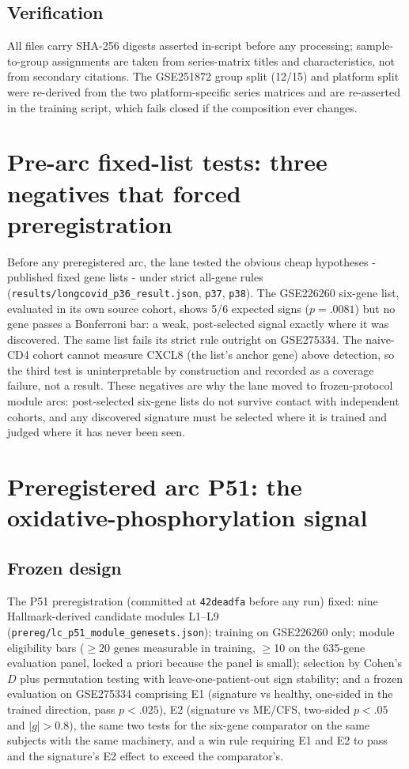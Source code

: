 \documentclass[11pt,a4paper]{article}
\begin{document}
\subsection{Verification}
All files carry SHA-256 digests asserted in-script before any processing;
sample-to-group assignments are taken from series-matrix titles and
characteristics, not from secondary citations. The GSE251872 group split
(12/15) and platform split were re-derived from the two platform-specific
series matrices and are re-asserted in the training script, which fails closed
if the composition ever changes.

\section{Pre-arc fixed-list tests: three negatives that forced preregistration}
Before any preregistered arc, the lane tested the obvious cheap hypotheses -
published fixed gene lists - under strict all-gene rules
(\texttt{results/longcovid\_p36\_result.json}, \texttt{p37}, \texttt{p38}).
The GSE226260 six-gene list, evaluated in its own source cohort, shows 5/6
expected signs ($p=.0081$) but no gene passes a Bonferroni bar: a weak,
post-selected signal exactly where it was discovered. The same list fails its
strict rule outright on GSE275334. The naive-CD4 cohort cannot measure CXCL8
(the list's anchor gene) above detection, so the third test is uninterpretable
by construction and recorded as a coverage failure, not a result. These
negatives are why the lane moved to frozen-protocol module arcs: post-selected
six-gene lists do not survive contact with independent cohorts, and any
discovered signature must be selected where it is trained and judged where it
has never been seen.

\section{Preregistered arc P51: the oxidative-phosphorylation signal}
\subsection{Frozen design}
The P51 preregistration (committed at \texttt{42deadfa} before any run) fixed:
nine Hallmark-derived candidate modules L1--L9
(\texttt{prereg/lc\_p51\_module\_genesets.json}); training on GSE226260 only;
module eligibility bars ($\geq$20 genes measurable in training, $\geq$10 on the
635-gene evaluation panel, locked a priori because the panel is small);
selection by Cohen's $D$ plus permutation testing with leave-one-patient-out
sign stability; and a frozen evaluation on GSE275334 comprising E1 (signature
vs healthy, one-sided in the trained direction, pass $p<.025$), E2 (signature
vs ME/CFS, two-sided $p<.05$ and $|g|>0.8$), the same two tests for the
six-gene comparator on the same subjects with the same machinery, and a win
rule requiring E1 and E2 to pass and the signature's E2 effect to exceed the
comparator's.
\end{document}
